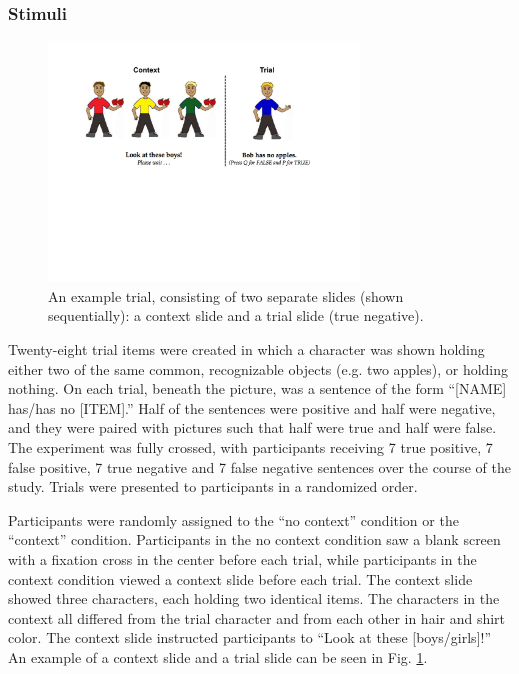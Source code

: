 \documentclass[10pt,letterpaper]{article}
\begin{document}
\subsubsection{Stimuli}

\begin{figure}[t]
\begin{center} 
\includegraphics[width=3.25in]{figures/negatron_trialfig2.pdf}
\caption{\label{fig:trial} An example trial, consisting of two separate slides (shown sequentially): a context slide and a trial slide (true negative). }
\vspace{-5mm}
\end{center} 
\end{figure}

Twenty-eight trial items were created in which a character was shown holding either two of the same common, recognizable objects (e.g. two apples), or holding nothing.  On each trial, beneath the picture, was a sentence of the form ``[NAME] has/has no [ITEM].''  Half of the sentences were positive and half were negative, and they were paired with pictures such that half were true and half were false.  The experiment was fully crossed, with participants receiving 7 true positive, 7 false positive, 7 true negative and 7 false negative sentences over the course of the study.  Trials were presented to participants in a randomized order.  

Participants were randomly assigned to the ``no context'' condition or the ``context'' condition.  Participants in the no context condition saw a blank screen with a fixation cross in the center before each trial, while participants in the context condition viewed a context slide before each trial.  The context slide showed three characters, each holding two identical items.  The characters in the context all differed from the trial character and from each other in hair and shirt color.  The context slide instructed participants to ``Look at these [boys/girls]!''  An example of a context slide and a trial slide can be seen in Fig. \ref{fig:trial}.  
\end{document}
